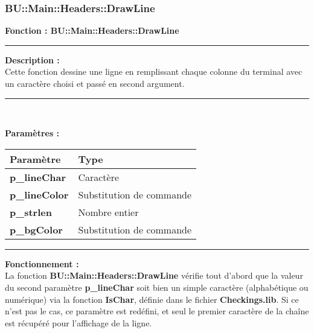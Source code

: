 \documentclass[a4paper,10pt]{article}
\begin{document}
\color{blue}
\subsubsection{BU::Main::Headers::DrawLine}\color{white}

\textbf{Fonction : \color{mauve}BU::Main::Headers::DrawLine}\setlength{\parskip}{1em}

\par\noindent\rule{\textwidth}{0.4pt}

\begin{justify}
    \textbf{Description :}\\[1\baselineskip]
    Cette fonction dessine une ligne en remplissant chaque colonne du terminal avec un caractère choisi et passé en second argument.
\end{justify}

\par\noindent\rule{\textwidth}{0.4pt}\\

\begin{justify}
    \textbf{Paramètres :}

    \begin{tabular}{|l|l|}
        \hline
        \textbf{Paramètre} & \textbf{Type}\\
        \hline
        \textbf{\color{orange}p\_lineChar} & Caractère\\
        \hline
        \textbf{\color{orange}p\_lineColor} & Substitution de commande\\
        \hline
        \textbf{\color{orange}p\_strlen} & Nombre entier\\
        \hline
        \textbf{\color{orange}p\_bgColor} & Substitution de commande\\
        \hline
    \end{tabular}
\end{justify}

\par\noindent\rule{\textwidth}{0.4pt}

\begin{justify}
    \textbf{Fonctionnement :}\\[1\baselineskip]
    La fonction \textbf{\color{mauve}BU::Main::Headers::DrawLine} vérifie tout d'abord que la valeur du second paramètre \textbf{\color{orange}p\_lineChar} soit bien un simple caractère (alphabétique ou numérique) via la fonction \textbf{\color{mauve}IsChar}, définie dans le fichier \textbf{\color{lime}Checkings.lib}. Si ce n'est pas le cas, ce paramètre est redéfini, et seul le premier caractère de la chaîne est récupéré pour l'affichage de la ligne.
\end{justify}
\end{document}

